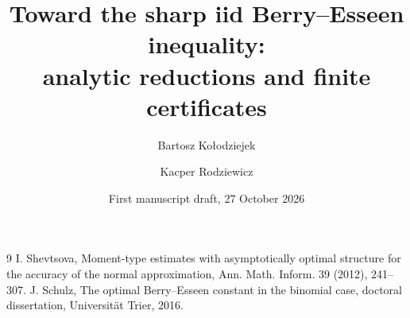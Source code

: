\documentclass[11pt,a4paper]{article}
\title{Toward the sharp iid Berry--Esseen inequality:\\
analytic reductions and finite certificates}
\author{Bartosz Ko{\l}odziejek \and Kacper Rodziewicz}
\date{First manuscript draft, 27 October 2026}
\theoremstyle{definition}
\theoremstyle{remark}
\begin{document}
\appendix

\begin{thebibliography}{9}
 I. Shevtsova, Moment-type estimates with asymptotically optimal structure for the accuracy of the normal approximation, Ann. Math. Inform. 39 (2012), 241--307.
 J. Schulz, The optimal Berry--Esseen constant in the binomial case, doctoral dissertation, Universit\"at Trier, 2016.
\end{thebibliography}
\end{document}
